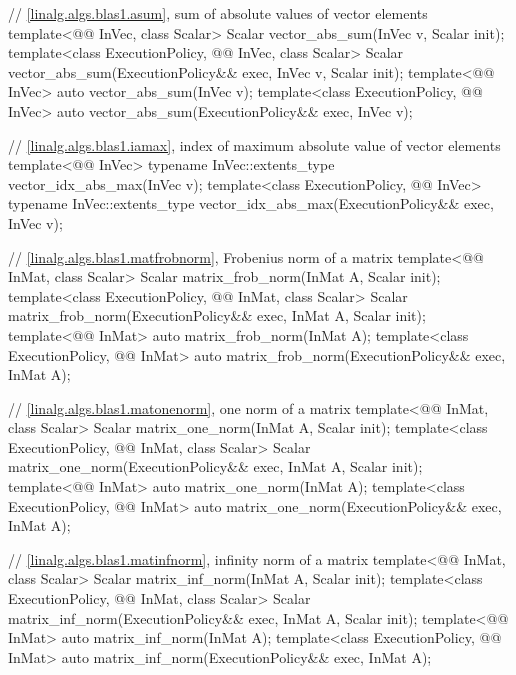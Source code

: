 \begin{codeblock}
{  // \ref{linalg.algs.blas1.asum}, sum of absolute values of vector elements
  template<@@ InVec, class Scalar>
    Scalar vector_abs_sum(InVec v, Scalar init);
  template<class ExecutionPolicy, @@ InVec, class Scalar>
    Scalar vector_abs_sum(ExecutionPolicy&& exec, InVec v, Scalar init);
  template<@@ InVec>
    auto vector_abs_sum(InVec v);
  template<class ExecutionPolicy, @@ InVec>
    auto vector_abs_sum(ExecutionPolicy&& exec, InVec v);

  // \ref{linalg.algs.blas1.iamax}, index of maximum absolute value of vector elements
  template<@@ InVec>
    typename InVec::extents_type vector_idx_abs_max(InVec v);
  template<class ExecutionPolicy, @@ InVec>
    typename InVec::extents_type vector_idx_abs_max(ExecutionPolicy&& exec, InVec v);

  // \ref{linalg.algs.blas1.matfrobnorm}, Frobenius norm of a matrix
  template<@@ InMat, class Scalar>
    Scalar matrix_frob_norm(InMat A, Scalar init);
  template<class ExecutionPolicy, @@ InMat, class Scalar>
    Scalar matrix_frob_norm(ExecutionPolicy&& exec, InMat A, Scalar init);
  template<@@ InMat>
    auto matrix_frob_norm(InMat A);
  template<class ExecutionPolicy, @@ InMat>
    auto matrix_frob_norm(ExecutionPolicy&& exec, InMat A);

  // \ref{linalg.algs.blas1.matonenorm}, one norm of a matrix
  template<@@ InMat, class Scalar>
    Scalar matrix_one_norm(InMat A, Scalar init);
  template<class ExecutionPolicy, @@ InMat, class Scalar>
    Scalar matrix_one_norm(ExecutionPolicy&& exec, InMat A, Scalar init);
  template<@@ InMat>
    auto matrix_one_norm(InMat A);
  template<class ExecutionPolicy, @@ InMat>
    auto matrix_one_norm(ExecutionPolicy&& exec, InMat A);

  // \ref{linalg.algs.blas1.matinfnorm}, infinity norm of a matrix
  template<@@ InMat, class Scalar>
    Scalar matrix_inf_norm(InMat A, Scalar init);
  template<class ExecutionPolicy, @@ InMat, class Scalar>
    Scalar matrix_inf_norm(ExecutionPolicy&& exec, InMat A, Scalar init);
  template<@@ InMat>
    auto matrix_inf_norm(InMat A);
  template<class ExecutionPolicy, @@ InMat>
    auto matrix_inf_norm(ExecutionPolicy&& exec, InMat A);

}
\end{codeblock}
